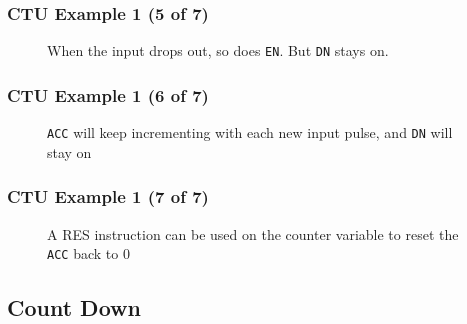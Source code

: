 \begin{frame}
    \frametitle{CTU Example 1 (5 of 7)}

    \begin{figure}
        \centering
        \resizebox{0.875\linewidth}{!}{
            
        }

        \vspace{0.5em}
        {\footnotesize When the input drops out, so does \texttt{EN}. But \texttt{DN} stays on.\par}
    \end{figure}
\end{frame}

\begin{frame}
    \frametitle{CTU Example 1 (6 of 7)}

    \begin{figure}
        \centering
        \resizebox{0.875\linewidth}{!}{
            
        }

        \vspace{0.5em}
        {\footnotesize \texttt{ACC} will keep incrementing with each new input pulse, and \texttt{DN} will stay on\par}
    \end{figure}
\end{frame}

\begin{frame}
    \frametitle{CTU Example 1 (7 of 7)}

    \begin{figure}
        \centering
        \resizebox{0.875\linewidth}{!}{
            
        }

        \vspace{0.5em}
        {\footnotesize A RES instruction can be used on the counter variable to reset the \texttt{ACC} back to 0\par}
    \end{figure}
\end{frame}

\subsection{Count Down}

